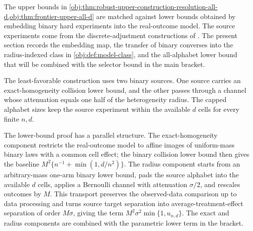 \documentclass[11pt]{article}
\begin{document}
The upper bounds in \cref{obj:thm:robust-upper-construction-resolution-all-d,obj:thm:frontier-upper-all-d} are matched against lower bounds obtained by embedding binary hard experiments into the real-outcome model. The source experiments come from the discrete-adjustment constructions of \citet{ZengBalakrishnanHanKennedy2024}. The present section records the embedding map, the transfer of binary converses into the radius-indexed class in \cref{obj:def:model-class}, and the all-alphabet lower bound that will be combined with the selector bound in the main bracket.

The least-favorable construction uses two binary sources. One source carries an exact-homogeneity collision lower bound, and the other passes through a channel whose attenuation equals one half of the heterogeneity radius. The capped alphabet sizes keep the source experiment within the available \(d\) cells for every finite \(n,d\).

The lower-bound proof has a parallel structure. The exact-homogeneity component restricts the real-outcome model to affine images of uniform-mass binary laws with a common cell effect; the binary collision lower bound then gives the baseline \(M^2\{n^{-1}+\min(1,d/n^2)\}\). The radius component starts from an arbitrary-mass one-arm binary lower bound, pads the source alphabet into the available \(d\) cells, applies a Bernoulli channel with attenuation \(\sigma/2\), and rescales outcomes by \(M\). This transport preserves the observed-data comparison up to data processing and turns source target separation into average-treatment-effect separation of order \(M\sigma\), giving the term \(M^2\sigma^2\min\{1,u_{n,d}\}\). The exact and radius components are combined with the parametric lower term in the bracket.
\end{document}
